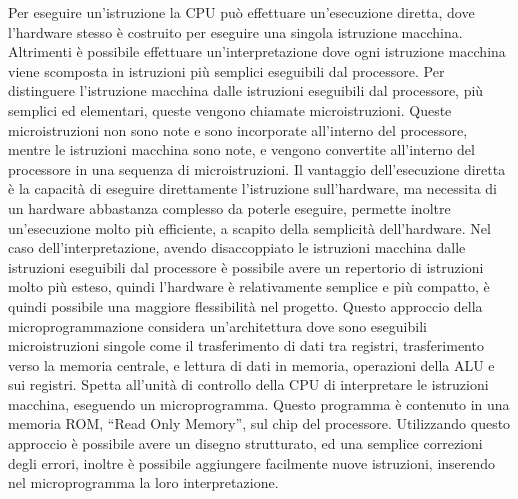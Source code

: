 \documentclass{article}
\numberwithin{equation}{subsection}
\begin{document}
Per eseguire un'istruzione la CPU può effettuare un'esecuzione diretta, dove l'hardware stesso è costruito per eseguire una singola istruzione macchina. Altrimenti è possibile effettuare 
un'interpretazione dove ogni istruzione macchina viene scomposta in istruzioni più semplici eseguibili dal processore. Per distinguere l'istruzione macchina dalle istruzioni 
eseguibili dal processore, più semplici ed elementari, queste vengono chiamate microistruzioni. Queste microistruzioni non sono note e sono incorporate all'interno del processore, 
mentre le istruzioni macchina sono note, e vengono convertite all'interno del processore in una sequenza di microistruzioni. 
Il vantaggio dell'esecuzione diretta è la capacità di eseguire direttamente l'istruzione sull'hardware, ma necessita di un hardware abbastanza complesso da poterle eseguire, 
permette inoltre un'esecuzione molto più efficiente, a scapito della semplicità dell'hardware. Nel caso dell'interpretazione, avendo disaccoppiato le istruzioni macchina dalle istruzioni 
eseguibili dal processore è possibile avere un repertorio di istruzioni molto più esteso, quindi l'hardware è relativamente semplice e più compatto, è quindi possibile una maggiore 
flessibilità nel progetto. 
Questo approccio della microprogrammazione considera un'architettura dove sono eseguibili microistruzioni singole come il trasferimento di dati tra registri, trasferimento verso la memoria centrale, e lettura di 
dati in memoria, operazioni della ALU e sui registri. Spetta all'unità di controllo della CPU di interpretare le istruzioni macchina, eseguendo un microprogramma. Questo programma è contenuto in una memoria ROM, ``Read 
Only Memory'', sul chip del processore. Utilizzando questo approccio è possibile avere un disegno strutturato, ed una semplice correzioni degli errori, inoltre è possibile aggiungere facilmente nuove istruzioni, 
inserendo nel microprogramma la loro interpretazione. 
\end{document}
